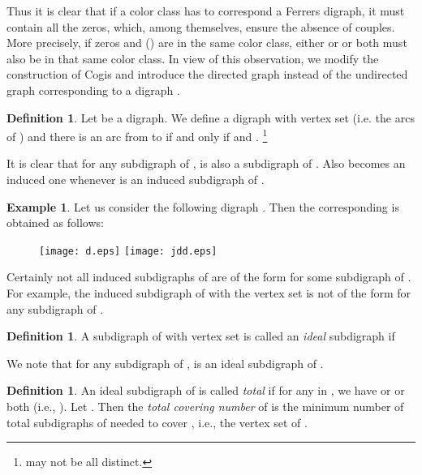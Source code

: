 \documentclass[11pt]{article}
\theoremstyle{definition}
\newtheorem{defn}[thm]{Definition}
\newtheorem{exmp}[thm]{Example}
\theoremstyle{remark}
\numberwithin{equation}{section}
\begin{document}
Thus it is clear that if a color class has to correspond a Ferrers digraph, it must contain all the zeros, which, among themselves, ensure the absence of couples. More precisely, if zeros  and  () are in the same color class, either  or  or both must also be in that same color class. In view of this observation, we modify the construction of Cogis and introduce the directed graph  instead of the undirected graph  corresponding to a digraph .

\begin{defn}Let  be a digraph. We define a digraph  with vertex set  (i.e. the arcs of ) and there is an arc from  to  if and only if  and . \footnote{ may not be all distinct.}
\end{defn}

It is clear that for any subdigraph  of ,  is also a subdigraph of . Also  becomes an induced one whenever  is an induced subdigraph of .

\begin{exmp}Let us consider the following digraph . Then the corresponding  is obtained as follows:
\begin{figure}[h]
\begin{center}
\texttt{[image: d.eps]}\hspace{1in}
\texttt{[image: jdd.eps]}

 \hspace{3in} 
\end{center}
\end{figure}
\end{exmp}

\vspace{-2em} Certainly not all induced subdigraphs of  are of the form  for some subdigraph  of . For example, the induced subdigraph of  with the vertex set  is not of the form  for any subdigraph  of .

\begin{defn} A subdigraph  of  with vertex set  is called an {\em ideal} subdigraph if

We note that for any subdigraph  of ,  is an ideal subdigraph of .
\end{defn}

\begin{defn} An ideal subdigraph  of  is called {\em total} if for any  in , we have  or  or both (i.e., ). Let . Then the {\em total covering number} of  is the minimum number of total subdigraphs of  needed to cover , i.e., the vertex set of .
\end{defn}
\end{document}
